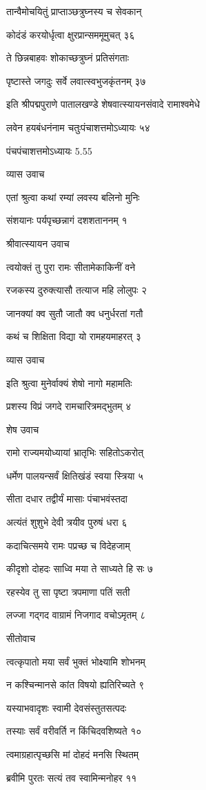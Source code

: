 तान्वैमोचयितुं प्राप्ताञ्छत्रुघ्नस्य च सेवकान्

कोदंडं करयोर्धृत्वा क्षुरप्रान्सममूमुचत् ३६

ते छिन्नबाहवः शोकाच्छत्रुघ्नं प्रतिसंगताः

पृष्टास्ते जगदुः सर्वे लवात्स्वभुजकृंतनम् ३७

इति श्रीपद्मपुराणे पातालखण्डे शेषवात्स्यायनसंवादे रामाश्वमेधे

लवेन हयबंधनंनाम चतुःपंचाशत्तमोऽध्यायः ५४

पंचपंचाशत्तमोऽध्यायः 5.55

व्यास उवाच

एतां श्रुत्वा कथां रम्यां लवस्य बलिनो मुनिः

संशयानः पर्यपृच्छन्नागं दशशताननम् १

श्रीवात्स्यायन उवाच

त्वयोक्तं तु पुरा रामः सीतामेकाकिनीं वने

रजकस्य दुरुक्त्यासौ तत्याज महि लोलुपः २

जानक्यां क्व सुतौ जातौ क्व धनुर्धरतां गतौ

कथं च शिक्षिता विद्या यो रामहयमाहरत् ३

व्यास उवाच

इति श्रुत्वा मुनेर्वाक्यं शेषो नागो महामतिः

प्रशस्य विप्रं जगदे रामचारित्रमद्भुतम् ४

शेष उवाच

रामो राज्यमयोध्यायां भ्रातृभिः सहितोऽकरोत्

धर्मेण पालयन्सर्वं क्षितिखंडं स्वया स्त्रिया ५

सीता दधार तद्वीर्यं मासाः पंचाभवंस्तदा

अत्यंतं शुशुभे देवी त्रयीव पुरुषं धरा ६

कदाचित्समये रामः पप्रच्छ च विदेहजाम्

कीदृशो दोहदः साध्वि मया ते साध्यते हि सः ७

रहस्येव तु सा पृष्टा त्रपमाणा पतिं सती

लज्जा गद्गद वाग्रामं निजगाद वचोऽमृतम् ८

सीतोवाच

त्वत्कृपातो मया सर्वं भुक्तं भोक्ष्यामि शोभनम्

न कश्चिन्मानसे कांत विषयो ह्यतिरिच्यते ९

यस्याभवादृशः स्वामी देवसंस्तुतसत्पदः

तस्याः सर्वं वरीवर्ति न किंचिदवशिष्यते १०

त्वमाग्रहात्पृच्छसि मां दोहदं मनसि स्थितम्

ब्रवीमि पुरतः सत्यं तव स्वामिन्मनोहर ११

